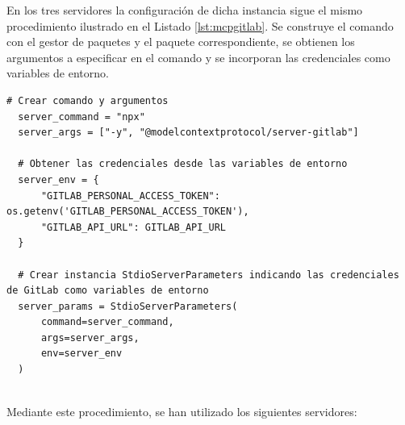 En los tres servidores la configuración de dicha instancia sigue el mismo procedimiento ilustrado en el Listado \ref{lst:mcpgitlab}. Se construye el comando con el gestor de paquetes y el paquete correspondiente, se obtienen los argumentos a especificar en el comando y se incorporan las credenciales como variables de entorno.

\begin{lstlisting}[caption={mcp\_multi\_client.py: instanciado de StdioServerParameters para el servidor MCP de GitLab},label={lst:mcpgitlab}]
  # Crear comando y argumentos
  server_command = "npx"
  server_args = ["-y", "@modelcontextprotocol/server-gitlab"]

  # Obtener las credenciales desde las variables de entorno
  server_env = {
      "GITLAB_PERSONAL_ACCESS_TOKEN": os.getenv('GITLAB_PERSONAL_ACCESS_TOKEN'),
      "GITLAB_API_URL": GITLAB_API_URL
  }

  # Crear instancia StdioServerParameters indicando las credenciales de GitLab como variables de entorno
  server_params = StdioServerParameters(
      command=server_command,
      args=server_args,
      env=server_env
  )
  
\end{lstlisting}
Mediante este procedimiento, se han utilizado los siguientes servidores:
